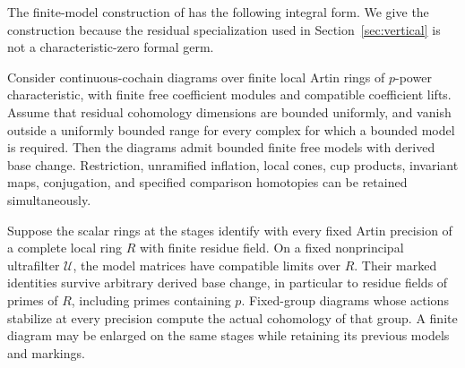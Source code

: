 The finite-model construction of \cite[Section 3, ``Finite models and
matrix limits'']{B} has the following integral form.  We
give the construction because the residual specialization used in
Section~\ref{sec:vertical} is not a characteristic-zero formal germ.

\begin{lemma}\label{models:finite-models}
Consider continuous-cochain diagrams over finite local Artin rings of
$p$-power characteristic, with finite free coefficient modules and
compatible coefficient lifts.  Assume that residual cohomology
dimensions are bounded uniformly, and vanish outside a uniformly
bounded range for every complex for which a bounded model is required.
Then the diagrams admit bounded finite free models with derived base
change.  Restriction, unramified inflation, local cones, cup products,
invariant maps, conjugation, and specified comparison homotopies can be
retained simultaneously.

Suppose the scalar rings at the stages identify with every fixed Artin
precision of a complete local ring $R$ with finite residue field.  On a
fixed nonprincipal ultrafilter $\mathcal U$, the model matrices have compatible
limits over $R$.  Their marked identities survive arbitrary derived
base change, in particular to residue fields of primes of $R$,
including primes containing $p$.  Fixed-group diagrams whose actions
stabilize at every precision compute the actual cohomology of that
group.  A finite diagram may be enlarged on the same stages while
retaining its previous models and markings.
\end{lemma}

